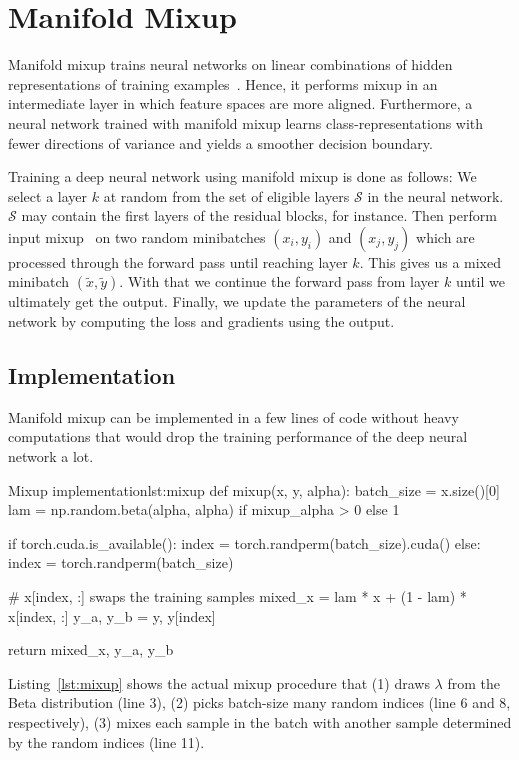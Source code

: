 \section{Manifold Mixup}
\label{sec:manifoldmixup}

Manifold mixup trains neural networks on linear combinations of hidden representations of training examples~\cite{verma19}.
Hence, it performs mixup in an intermediate layer in which feature spaces are more aligned.
Furthermore, a neural network trained with manifold mixup learns class-representations with fewer directions of variance and yields a smoother decision boundary.

Training a deep neural network using manifold mixup is done as follows:
We select a layer $k$ at random from the set of eligible layers $\mathcal{S}$ in the neural network. 
$\mathcal{S}$ may contain the first layers of the residual blocks, for instance.
Then perform input mixup~\cite{zhang17} on two random minibatches $(x_i, y_i)$ and $(x_j,y_j)$ which are processed through the forward pass until reaching layer $k$. This gives us a mixed minibatch $(\tilde{x}, \tilde{y})$.
With that we continue the forward pass from layer $k$ until we ultimately get the output.
Finally, we update the parameters of the neural network by computing the loss and gradients using the output.

\subsection{Implementation}

Manifold mixup can be implemented in a few lines of code without heavy computations that would drop the training performance of the deep neural network a lot.

\begin{code}{Mixup implementation}{lst:mixup}
def mixup(x, y, alpha):
    batch_size = x.size()[0]
    lam = np.random.beta(alpha, alpha) if mixup_alpha > 0 else 1

    if torch.cuda.is_available():
        index = torch.randperm(batch_size).cuda()
    else:
        index = torch.randperm(batch_size)

    # x[index, :] swaps the training samples
    mixed_x = lam * x + (1 - lam) * x[index, :]
    y_a, y_b = y, y[index]
    
    return mixed_x, y_a, y_b
\end{code}

Listing~\ref{lst:mixup} shows the actual mixup procedure that 
(1) draws $\lambda$ from the Beta distribution (line 3),
(2) picks batch-size many random indices (line 6 and 8, respectively),
(3) mixes each sample in the batch with another sample determined by the random indices (line 11).

